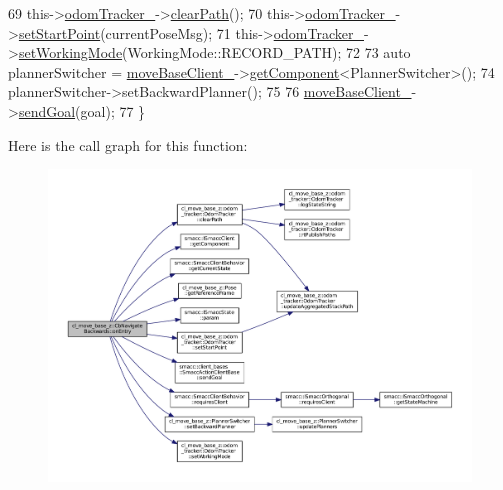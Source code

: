 \begin{DoxyCode}
69     this->\hyperlink{classcl__move__base__z_1_1CbNavigateBackwards_a75a8ae7aef6c72e96f4037c4941b0341}{odomTracker\_}->\hyperlink{classcl__move__base__z_1_1odom__tracker_1_1OdomTracker_a93a14e15e3e623f530e056f403bf7644}{clearPath}();
70     this->\hyperlink{classcl__move__base__z_1_1CbNavigateBackwards_a75a8ae7aef6c72e96f4037c4941b0341}{odomTracker\_}->\hyperlink{classcl__move__base__z_1_1odom__tracker_1_1OdomTracker_a9f4989c6353022c2ec3b0546c09bf3bc}{setStartPoint}(currentPoseMsg);
71     this->\hyperlink{classcl__move__base__z_1_1CbNavigateBackwards_a75a8ae7aef6c72e96f4037c4941b0341}{odomTracker\_}->\hyperlink{classcl__move__base__z_1_1odom__tracker_1_1OdomTracker_aeed01bdefd9a1cc709b0b3e4eed285ed}{setWorkingMode}(WorkingMode::RECORD\_PATH);
72 
73     \textcolor{keyword}{auto} plannerSwitcher = \hyperlink{classcl__move__base__z_1_1CbNavigateBackwards_a943c1a790eac9266adf11fbdc078f03a}{moveBaseClient\_}->\hyperlink{classsmacc_1_1ISmaccClient_adef78db601749ca63c19e74a27cb88cc}{getComponent}<PlannerSwitcher>();
74     plannerSwitcher->setBackwardPlanner();
75 
76     \hyperlink{classcl__move__base__z_1_1CbNavigateBackwards_a943c1a790eac9266adf11fbdc078f03a}{moveBaseClient\_}->\hyperlink{classsmacc_1_1client__bases_1_1SmaccActionClientBase_a9c47a5094ac8afb01680307fe5eca922}{sendGoal}(goal);
77 \}
\end{DoxyCode}


Here is the call graph for this function\+:
\nopagebreak
\begin{figure}[H]
\begin{center}
\leavevmode
\includegraphics[width=350pt]{classcl__move__base__z_1_1CbNavigateBackwards_a545a5282f0ef6b0080b46002d6037567_cgraph}
\end{center}
\end{figure}


